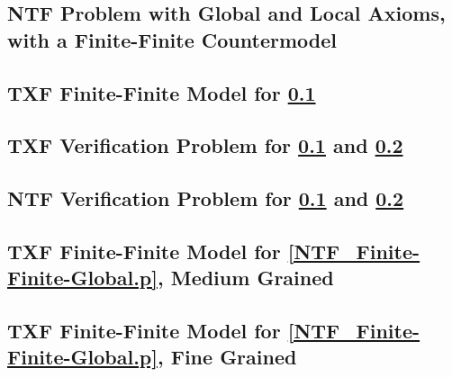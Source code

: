 \documentclass{easychair}
\begin{document}
\newpage
\subsection{NTF Problem with Global and Local Axioms, \\
            with a Finite-Finite Countermodel}
\label{NTF_Finite-Finite-Local.p}
\begin{small}

\end{small}

\newpage
\subsection{TXF Finite-Finite Model for \ref{NTF_Finite-Finite-Local.p}}
\label{NTF_Finite-Finite-Local.s}
\begin{small}

\end{small}

\newpage
\subsection{TXF Verification Problem for \ref{NTF_Finite-Finite-Local.p} and
\ref{NTF_Finite-Finite-Local.s}}
\label{NTF_Finite-Finite-Local.s.p}
\begin{small}

\end{small}

\newpage
\subsection{NTF Verification Problem for \ref{NTF_Finite-Finite-Local.p} and
\ref{NTF_Finite-Finite-Local.s}}
\label{NTF_Finite-Finite-Local.s.NTF.p}
\begin{small}

\end{small}

\newpage
\subsection{TXF Finite-Finite Model for \ref{NTF_Finite-Finite-Global.p}, Medium Grained}
\label{NTF_Finite-Finite-Global_Medium.s}
\begin{small}

\end{small}

\newpage
\subsection{TXF Finite-Finite Model for \ref{NTF_Finite-Finite-Global.p}, Fine Grained}
\label{NTF_Finite-Finite-Global_Fine.s}
\begin{small}

\end{small}
\end{document}
